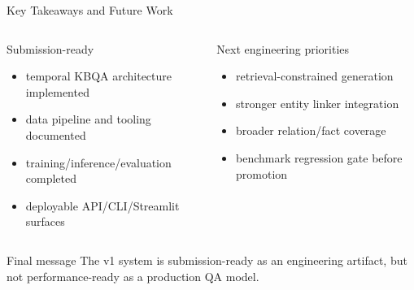 \begin{frame}[shrink=8]{Key Takeaways and Future Work}
  \begin{columns}[T]
    \begin{block}{Submission-ready}
      \small
      \begin{itemize}
        \item temporal KBQA architecture implemented
        \item data pipeline and tooling documented
        \item training/inference/evaluation completed
        \item deployable API/CLI/Streamlit surfaces
      \end{itemize}
    \end{block}
    \begin{exampleblock}{Next engineering priorities}
      \small
      \begin{itemize}
        \item retrieval-constrained generation
        \item stronger entity linker integration
        \item broader relation/fact coverage
        \item benchmark regression gate before promotion
      \end{itemize}
    \end{exampleblock}
  \end{columns}
  \vspace{0.15cm}
  \begin{alertblock}{Final message}
    The v1 system is submission-ready as an engineering artifact, but not performance-ready as a production QA model.
  \end{alertblock}
\end{frame}
